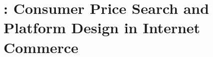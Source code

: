 \section{\cite{dinerstein2018consumer}: Consumer Price Search and Platform Design in Internet Commerce}